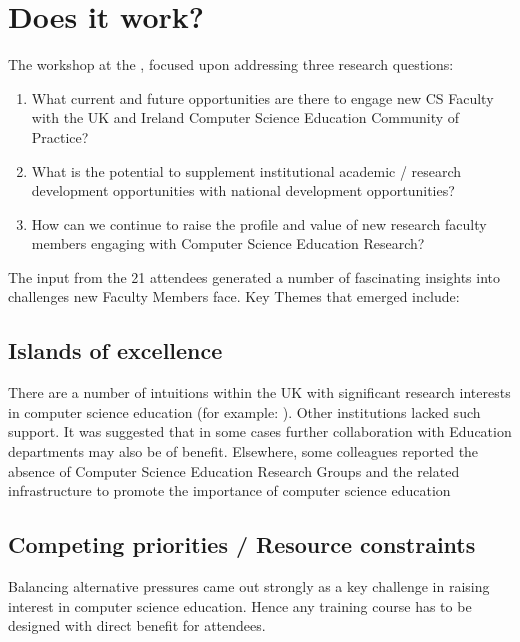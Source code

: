 \documentclass[sigconf]{acmart}
\begin{document}
\section{Does it work?}	

The workshop  at the  , focused upon addressing three research questions:
\begin{enumerate}
\item What current and future opportunities are there to engage new CS Faculty with the UK and Ireland Computer Science Education Community of Practice?
\item What is the potential to supplement institutional academic / research development opportunities with national development opportunities?
\item How can we continue to raise the profile and value of new research faculty members engaging with Computer Science Education Research?
\end{enumerate}
The input from the 21 attendees generated a number of fascinating insights into challenges new Faculty Members face. Key Themes that emerged include:

\subsection{Islands of excellence}
There are a number of intuitions within the UK with significant research interests in computer science education (for example: ). Other institutions lacked such support. It was suggested that in some cases further collaboration with Education departments may also be of benefit. Elsewhere, some colleagues reported the absence of Computer Science Education Research Groups and the related infrastructure to promote the importance of computer science education
\subsection{Competing priorities / Resource constraints}
Balancing alternative pressures came out strongly as a key challenge in raising interest in computer science education. Hence any training course has to be designed with direct benefit for attendees. 
\end{document}
